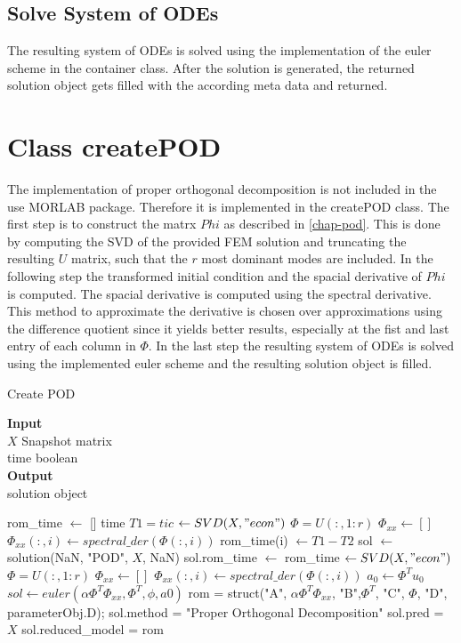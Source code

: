 \subsection{Solve System of ODEs}
The resulting system of ODEs is solved using the implementation of the euler scheme in the container class.
After the solution is generated, the returned solution object gets filled with the according meta data and returned.

\section{Class createPOD}
The implementation of proper orthogonal decomposition is not included in the use MORLAB package.
Therefore it is implemented in the createPOD class.
The first step is to construct the matrx \(Phi\) as described in \ref{chap-pod}.
This is done by computing the SVD of the provided FEM solution and truncating the resulting \(U\) matrix, such that the \(r\) most dominant modes are included.
In the following step the transformed initial condition and the spacial derivative of \(Phi\) is computed.
The spacial derivative is computed using the spectral derivative.
This method to approximate the derivative  is chosen over approximations using the difference quotient since it yields better results, especially at the fist and last entry of each column in \(\Phi\).
In the last step the resulting system of ODEs is solved using the implemented euler scheme and the resulting solution object is filled.
\begin{algorithm}[H]
\caption{Create POD}
\textbf{Input} \\
\hspace*{\algorithmicindent} $X$ Snapshot matrix \\
\hspace*{\algorithmicindent} time boolean \\
\textbf{Output} \\
\hspace*{\algorithmicindent} solution object
\begin{algorithmic}[1]
\State rom\_time $\gets$ []
\If time
\State $T1 = tic$
\State [$U$, $S$, $V$] $\gets SVD(X, "econ")$
\State $\Phi = U(:, 1:r)$
\State $\Phi_{xx} \gets []$
\State $\Phi_{xx}(:, i) \gets spectral\_der(\Phi(:, i))$
\EndFor
\State rom\_time(i) $\gets T1 - T2$
\EndFor
\State sol $\gets$ solution(NaN, "POD", $X$, NaN)
\State sol.rom\_time $\gets$ rom\_time
\EndIf
\State [$U$, $S$, $V$] $\gets SVD(X, "econ")$
\State $\Phi = U(:, 1:r)$
\State $\Phi_{xx} \gets []$
\State $\Phi_{xx}(:, i) \gets spectral\_der(\Phi(:, i))$
\EndFor
\State $a_0 \gets \Phi^{T} u_0$
\State $sol \gets euler(\alpha \Phi^{T} \Phi_{xx}, \Phi^{T}, \phi, a0)$
\State rom = struct("A", $\alpha \Phi^{T} \Phi_{xx}$, "B",$\Phi^{T}$, "C", $\Phi$, "D", parameterObj.D);
\State sol.method = "Proper Orthogonal Decomposition"
\State sol.pred = $X$
\State sol.reduced\_model = rom
\EndProcedure
\end{algorithmic}
\end{algorithm}
